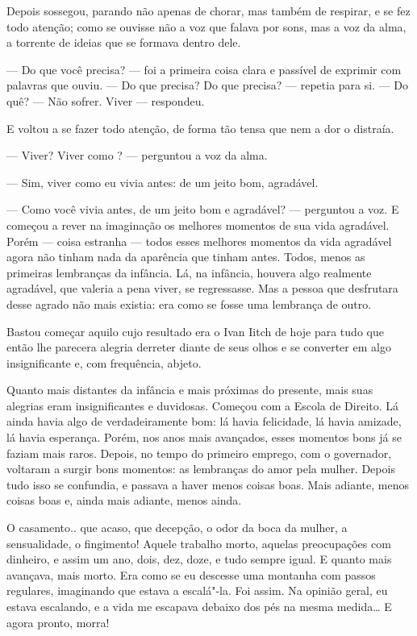 Depois sossegou, parando não apenas de chorar, mas também de respirar, e
se fez todo atenção; como se ouvisse não a voz que falava por sons, mas
a voz da alma, a torrente de ideias que se formava dentro dele.

--- Do que você precisa? --- foi a primeira coisa clara e passível de
exprimir com palavras que ouviu. --- Do que precisa? Do que precisa? ---
repetia para si. --- Do quê? --- Não sofrer. Viver --- respondeu.

E voltou a se fazer todo atenção, de forma tão tensa que nem a dor o
distraía.

--- Viver? Viver como ? --- perguntou a voz da alma.

--- Sim, viver como eu vivia antes: de um jeito bom, agradável.

--- Como você vivia antes, de um jeito bom e agradável? --- perguntou a voz.
E começou a rever na imaginação os melhores momentos de sua vida
agradável. Porém --- coisa estranha --- todos esses melhores momentos da
vida agradável agora não tinham nada da aparência que tinham antes.
Todos, menos as primeiras lembranças da infância. Lá, na infância,
houvera algo realmente agradável, que valeria a pena viver, se
regressasse. Mas a pessoa que desfrutara desse agrado não mais existia:
era como se fosse uma lembrança de outro.

Bastou começar aquilo cujo resultado era o Ivan Iitch de hoje para tudo
que então lhe parecera alegria derreter diante de seus olhos e se
converter em algo insignificante e, com frequência, abjeto.

Quanto mais distantes da infância e mais próximas do presente, mais suas
alegrias eram insignificantes e duvidosas. Começou com a Escola de
Direito. Lá ainda havia algo de verdadeiramente bom: lá havia
felicidade, lá havia amizade, lá havia esperança. Porém, nos anos mais
avançados, esses momentos bons já se faziam mais raros. Depois, no tempo
do primeiro emprego, com o governador, voltaram a surgir bons momentos:
as lembranças do amor pela mulher. Depois tudo isso se confundia, e
passava a haver menos coisas boas. Mais adiante, menos coisas boas e,
ainda mais adiante, menos ainda.

O casamento.. que acaso, que decepção, o odor da boca da mulher, a
sensualidade, o fingimento! Aquele trabalho morto, aquelas preocupações
com dinheiro, e assim um ano, dois, dez, doze, e tudo sempre igual. E
quanto mais avançava, mais morto. Era como se eu descesse uma montanha
com passos regulares, imaginando que estava a escalá"-la. Foi assim. Na
opinião geral, eu estava escalando, e a vida me escapava debaixo dos pés
na mesma medida\ldots{} E agora pronto, morra!

